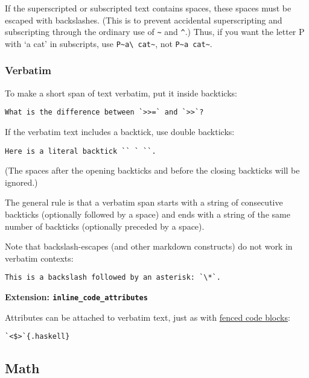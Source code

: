 \documentclass[]{article}
\begin{document}
If the superscripted or subscripted text contains spaces, these spaces
must be escaped with backslashes. (This is to prevent accidental
superscripting and subscripting through the ordinary use of
\texttt{\textasciitilde{}} and \texttt{\^{}}.) Thus, if you want the
letter P with `a cat' in subscripts, use
\texttt{P\textasciitilde{}a\textbackslash{} cat\textasciitilde{}}, not
\texttt{P\textasciitilde{}a cat\textasciitilde{}}.

\subsubsection{Verbatim}

To make a short span of text verbatim, put it inside backticks:

\begin{verbatim}
What is the difference between `>>=` and `>>`?
\end{verbatim}

If the verbatim text includes a backtick, use double backticks:

\begin{verbatim}
Here is a literal backtick `` ` ``.
\end{verbatim}

(The spaces after the opening backticks and before the closing backticks
will be ignored.)

The general rule is that a verbatim span starts with a string of
consecutive backticks (optionally followed by a space) and ends with a
string of the same number of backticks (optionally preceded by a space).

Note that backslash-escapes (and other markdown constructs) do not work
in verbatim contexts:

\begin{verbatim}
This is a backslash followed by an asterisk: `\*`.
\end{verbatim}

\textbf{Extension: \texttt{inline\_code\_attributes}}

Attributes can be attached to verbatim text, just as with
\hyperref[fenced-code-blocks]{fenced code blocks}:

\begin{verbatim}
`<$>`{.haskell}
\end{verbatim}

\subsection{Math}
\end{document}
